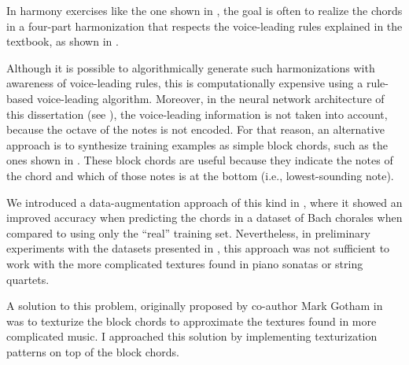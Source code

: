 
In harmony exercises like the one shown in
, the goal is often to
\gls{realize} the chords in a four-part harmonization that
respects the voice-leading rules explained in the textbook,
as shown in . 


Although it is possible to algorithmically generate such
harmonizations with awareness of voice-leading rules, this
is computationally expensive using a rule-based
voice-leading
algorithm.
Moreover, in the neural network architecture of this
dissertation (see ), the voice-leading
information is not taken into account, because the octave of
the notes is not encoded. For that reason, an alternative
approach is to synthesize training examples as simple block
chords, such as the ones shown in
. These block chords are useful
because they indicate the notes of the chord and which of
those notes is at the bottom (i.e., lowest-sounding note). 

We introduced a data-augmentation approach of this kind in
\textcite{napoleslopez2020harmonic}, where it showed an
improved accuracy when predicting the chords in a dataset of
Bach chorales when compared to using only the ``real''
training set. Nevertheless, in preliminary experiments with
the datasets presented in
, this approach was not
sufficient to work with the more complicated textures found
in piano sonatas or string quartets.


A solution to this problem, originally proposed by co-author
Mark Gotham in \textcite{napoleslopez2021augmentednet} was
to texturize the block chords to approximate the textures
found in more complicated music. I approached this solution
by implementing texturization patterns on top of the block
chords.
